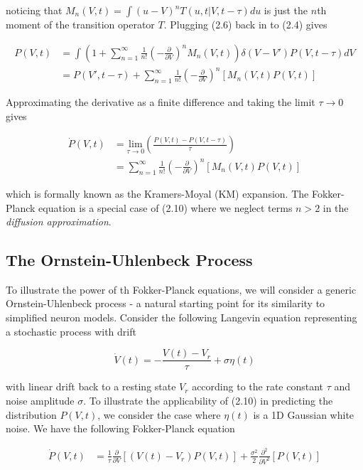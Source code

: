 \documentclass{ucetd}
\begin{document}
noticing that $M_{n}(V,t) = \int(u-V)^{n}T(u, t | V, t-\tau)du$ is just the $n$th moment of the transition operator $T$. Plugging (2.6) back in to (2.4) gives 

\begin{align}
P(V, t) &= \int \left(1 + \sum_{n=1}^{\infty} \frac{1}{n!}\left(-\frac{\partial}{\partial V}\right)^{n} M_{n}(V,t)\right)\delta(V-V')P(V, t-\tau)dV\\
&= P(V', t-\tau) + \sum_{n=1}^{\infty} \frac{1}{n!}\left(-\frac{\partial}{\partial V}\right)^{n} \left[M_{n}(V,t)P(V,t)\right]
\end{align} 

Approximating the derivative as a finite difference and taking the limit $\tau\rightarrow 0$ gives

\begin{align}
\dot{P}(V,t)  &= \underset{\tau\rightarrow 0}{\mathrm{lim}}\left(\frac{P(V, t)-P(V, t-\tau)}{\tau}\right)\\
&= \sum_{n=1}^{\infty} \frac{1}{n!}\left(-\frac{\partial}{\partial V}\right)^{n} \left[M_{n}(V,t)P(V,t)\right]
\end{align} 

which is formally known as the Kramers-Moyal (KM) expansion. The Fokker-Planck equation is a special case of (2.10) where we neglect terms $n>2$ in the \emph{diffusion approximation}.

\subsection{The Ornstein-Uhlenbeck Process}

To illustrate the power of th Fokker-Planck equations, we will consider a generic Ornstein-Uhlenbeck process - a natural starting point for its similarity to simplified neuron models. Consider the following Langevin equation representing a stochastic process with drift

\begin{equation*}
\dot{V}(t) = -\frac{V(t)-V_{r}}{\tau} + \sigma\eta(t)
\end{equation*}

with linear drift back to a resting state $V_{r}$ according to the rate constant $\tau$ and noise amplitude $\sigma$. To illustrate the applicability of (2.10) in predicting the distribution $P(V,t)$, we consider the case where $\eta(t)$ is a 1D Gaussian white noise. We have the following Fokker-Planck equation

\begin{align*}
\dot{P}(V,t) &= \frac{1}{\tau}\frac{\partial}{\partial V}[\left(V(t)-V_{r}\right) P(V,t)] + \frac{\sigma^{2}}{2}\frac{\partial^{2}}{\partial V^{2}}[P(V,t)]\\
\end{align*}
\end{document}
